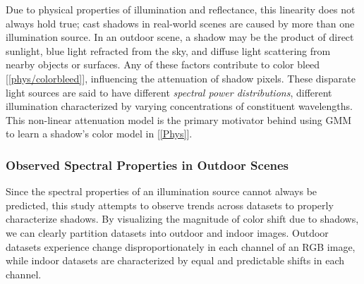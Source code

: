 Due to physical properties of illumination and reflectance, this linearity does not always hold true; cast shadows in real-world scenes are caused by more than one illumination source. In an outdoor scene, a shadow may be the product of direct sunlight, blue light refracted from the sky, and diffuse light scattering from nearby objects or surfaces. Any of these factors contribute to color bleed [\ref{phys/colorbleed}], influencing the attenuation of shadow pixels. These disparate light sources are said to have different \textit{spectral power distributions}, different illumination characterized by varying concentrations of constituent wavelengths. This non-linear attenuation model is the primary motivator behind using GMM to learn a shadow's color model in [\ref{Phys}].

\FloatBarrier
\subsubsection{Observed Spectral Properties in Outdoor Scenes} \label{section:spectralprop}

Since the spectral properties of an illumination source cannot always be predicted, this study attempts to observe trends across datasets to properly characterize shadows. By visualizing the magnitude of color shift due to shadows, we can clearly partition datasets into outdoor and indoor images. Outdoor datasets experience change disproportionately in each channel of an RGB image, while indoor datasets are characterized by equal and predictable shifts in each channel.

